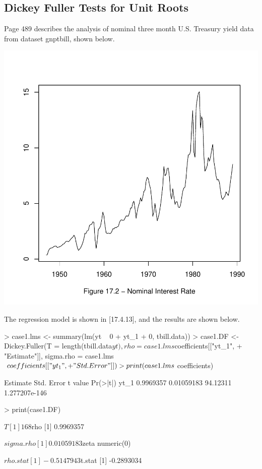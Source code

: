 \subsection{Dickey Fuller Tests for Unit Roots}
Page 489 describes the analysis of nominal
three month U.S. Treasury
yield data from
dataset gnptbill, shown below.
\begin{Schunk}
\end{Schunk}
\begin{center}
\includegraphics{p489-007}
\end{center}
The regression model is shown in [17.4.13], and the results are shown below.
\begin{Schunk}
\begin{Sinput}
> case1.lms <- summary(lm(yt ~ 0 + yt_1 + 0, tbill.data))
> case1.DF <- Dickey.Fuller(T = length(tbill.data$yt), rho = case1.lms$coefficients[["yt_1", 
+     "Estimate"]], sigma.rho = case1.lms$coefficients[["yt_1", 
+     "Std. Error"]])
> print(case1.lms$coefficients)
\end{Sinput}
\begin{Soutput}
      Estimate Std. Error  t value      Pr(>|t|)
yt_1 0.9969357 0.01059183 94.12311 1.277207e-146
\end{Soutput}
\begin{Sinput}
> print(case1.DF)
\end{Sinput}
\begin{Soutput}
$T
[1] 168

$rho
[1] 0.9969357

$sigma.rho
[1] 0.01059183

$zeta
numeric(0)

$rho.stat
[1] -0.5147943

$t.stat
[1] -0.2893034
\end{Soutput}
\end{Schunk}
